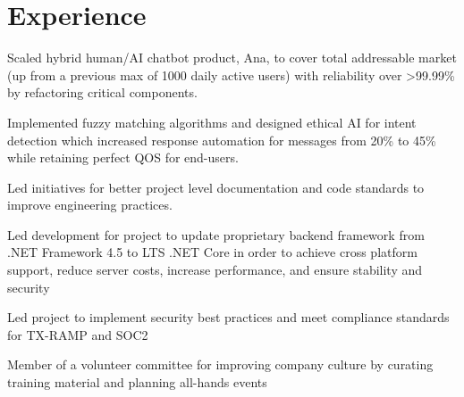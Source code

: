 \documentclass[no-math]{deedy-resume-openfont}
\begin{document}
	\hfill
	\begin{minipage}[t]{0.66\textwidth} 
		
		\section{Experience}
		
		\vspace{\topsep} %
		\begin{tightemize}
			\item Scaled hybrid human/AI chatbot product, Ana, to cover total addressable market  (up from a previous max of 1000 daily active users) with reliability over >99.99\% by refactoring critical components.
			\item Implemented fuzzy matching algorithms and designed ethical AI for intent detection
			 which increased response automation for messages from 20\% to 45\% while retaining perfect QOS for end-users.
			\item Led initiatives for better project level documentation and code standards to improve engineering practices. 
			\item Led development for project to update proprietary backend framework from .NET Framework 4.5 to LTS .NET Core in order to achieve cross platform support, reduce server costs, increase performance, and ensure stability and security
			\item Led project to implement security best practices and meet compliance standards for TX-RAMP and SOC2 
			\item Member of a volunteer committee for improving company culture by curating training material and planning all-hands events
		\end{tightemize}
		\sectionsep
		

\end{minipage}
\end{document}
